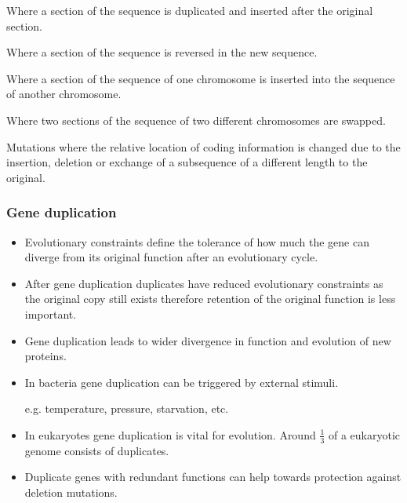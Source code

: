 \documentclass[a4paper]{article}
\begin{document}

Where a section of the sequence is duplicated and inserted after the original
section.


Where a section of the sequence is reversed in the new sequence.


Where a section of the sequence of one chromosome is inserted into the sequence
of another chromosome.


Where two sections of the sequence of two different chromosomes are swapped.


Mutations where the relative location of coding information is changed due to
the insertion, deletion or exchange of a subsequence of a different length to
the original.

\subsubsection{Gene duplication}

\begin{itemize}
  \item
    Evolutionary constraints define the tolerance of how much the gene can
    diverge from its original function after an evolutionary cycle.

  \item
    After gene duplication duplicates have reduced evolutionary constraints as
    the original copy still exists therefore retention of the original function
    is less important.

  \item
    Gene duplication leads to wider divergence in function and evolution of new
    proteins.

  \item
    In bacteria gene duplication can be triggered by external stimuli.

    e.g. temperature, pressure, starvation, etc.

  \item
    In eukaryotes gene duplication is vital for evolution. Around $\frac{1}{3}$
    of a eukaryotic genome consists of duplicates.

  \item
    Duplicate genes with redundant functions can help towards protection against
    deletion mutations.
\end{itemize}
\end{document}
